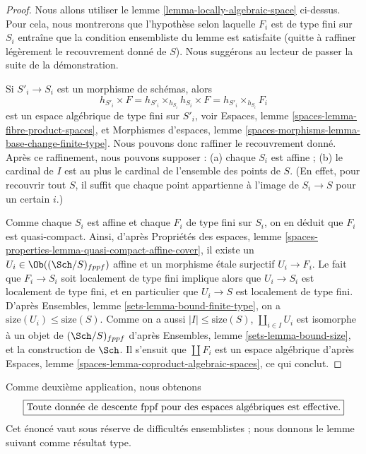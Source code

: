 \begin{proof}
Nous allons utiliser le
lemme \ref{lemma-locally-algebraic-space}
ci-dessus. Pour cela, nous montrerons que l'hypothèse selon laquelle
$F_i$ est de type fini sur $S_i$ entraîne que la condition ensembliste
du lemme est satisfaite (quitte à raffiner légèrement le
recouvrement donné de $S$).
Nous suggérons au lecteur de passer la suite de la démonstration.

\medskip\noindent
Si $S'_i \to S_i$ est un morphisme de schémas, alors
$$
h_{S'_i} \times F =
h_{S'_i} \times_{h_{S_i}} h_{S_i} \times F =
h_{S'_i} \times_{h_{S_i}} F_i
$$
est un espace algébrique de type fini sur $S'_i$, voir
Espaces, lemme \ref{spaces-lemma-fibre-product-spaces},
et
Morphismes d'espaces,
lemme \ref{spaces-morphisms-lemma-base-change-finite-type}.
Nous pouvons donc raffiner le recouvrement donné. Après ce raffinement, nous pouvons supposer :
(a) chaque $S_i$ est affine ; (b) le cardinal de $I$ est au plus
le cardinal de l'ensemble des points de $S$. (En effet, pour recouvrir
tout $S$, il suffit que chaque point appartienne à l'image de $S_i \to S$
pour un certain $i$.)

\medskip\noindent
Comme chaque $S_i$ est affine et chaque $F_i$ de type fini sur $S_i$,
on en déduit que $F_i$ est quasi-compact. Ainsi, d'après
Propriétés des espaces,
lemme \ref{spaces-properties-lemma-quasi-compact-affine-cover},
il existe un $U_i \in \Ob((\Sch/S)_{fppf})$ affine
et un morphisme étale surjectif $U_i \to F_i$. Le fait que
$F_i \to S_i$ soit localement de type fini implique alors que
$U_i \to S_i$ est localement de type fini, et en particulier que
$U_i \to S$ est localement de type fini. D'après
Ensembles, lemme \ref{sets-lemma-bound-finite-type},
on a $\text{size}(U_i) \leq \text{size}(S)$.
Comme on a aussi $|I| \leq \text{size}(S)$,
$\coprod_{i \in I} U_i$ est isomorphe à un objet de
$(\Sch/S)_{fppf}$ d'après
Ensembles, lemme \ref{sets-lemma-bound-size},
et la construction de $\Sch$. Il s'ensuit que
$\coprod F_i$ est un espace algébrique d'après
Espaces, lemme \ref{spaces-lemma-coproduct-algebraic-spaces},
ce qui conclut.
\end{proof}

\noindent
Comme deuxième application, nous obtenons
$$
\fbox{Toute donnée de descente fppf pour des espaces algébriques est effective.}
$$
Cet énoncé vaut sous réserve de difficultés ensemblistes ; nous donnons
le lemme suivant comme résultat type.

